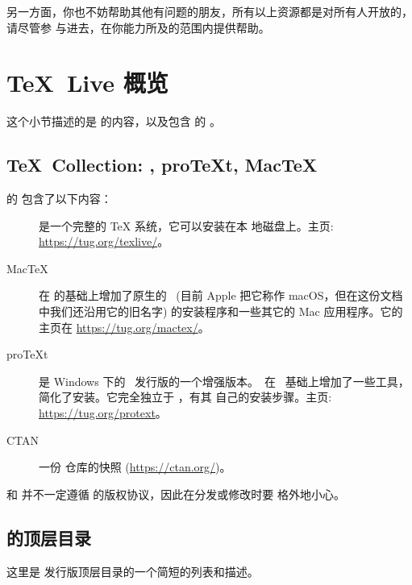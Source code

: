 \documentclass{article}
\begin{document}
另一方面，你也不妨帮助其他有问题的朋友，所有以上资源都是对所有人开放的，请尽管参
与进去，在你能力所及的范围内提供帮助。

\section{\protect\TeX\protect\ Live 概览}
\label{sec:overview-tl}

这个小节描述的是 \TL{} 的内容，以及包含 \TL{} 的 \TK{}。

\subsection{\protect\TeX\protect\ Collection: \protect\TL,
  pro\protect\TeX{}t, Mac\protect\TeX}
\label{sec:tl-coll-dists}

\TK{} 的 \DVD{} 包含了以下内容：

\begin{description}

  \item [\TL] 是一个完整的 \TeX{} 系统，它可以安装在本
        地磁盘上。主页: \url{https://tug.org/texlive/}。

  \item [Mac\TeX] 在 \TL{} 的基础上增加了原生的 \MacOSX\ (目前 Apple 把它称作
        macOS，但在这份文档中我们还沿用它的旧名字) 的安装程序和一些其它的
        Mac 应用程序。它的主页在 \url{https://tug.org/mactex/}。

  \item [pro\TeX{}t] 是 Windows 下的 \MIKTEX\ 发行版的一个增强版本。\ProTeXt\ 在
        \MIKTEX\ 基础上增加了一些工具，简化了安装。它完全独立于 \TL{}，有其
        自己的安装步骤。主页: \url{https://tug.org/protext}。

  \item [CTAN] 一份 \CTAN{} 仓库的快照 (\url{https://ctan.org/})。

\end{description}

\CTAN{} 和  并不一定遵循 \TL{} 的版权协议，因此在分发或修改时要
格外地小心。

\subsection{\protect\TL{} 的顶层目录}
\label{sec:tld}

这里是 \TL{} 发行版顶层目录的一个简短的列表和描述。
\end{document}
